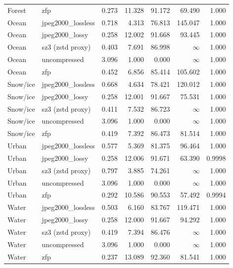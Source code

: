 \begin{table}[t]
\begin{tabular}{@{}llrrrrr@{}}
Forest      & zfp                & 0.273 & 11.328 & 91.172 & 69.490   & 1.000 \\
Ocean       & jpeg2000\_lossless & 0.718 & 4.313  & 76.813 & 145.047  & 1.000 \\
Ocean       & jpeg2000\_lossy    & 0.258 & 12.002 & 91.668 & 93.445   & 1.000 \\
Ocean       & sz3 (zstd proxy)   & 0.403 & 7.691  & 86.998 & $\infty$ & 1.000 \\
Ocean       & uncompressed       & 3.096 & 1.000  & 0.000  & $\infty$ & 1.000 \\
Ocean       & zfp                & 0.452 & 6.856  & 85.414 & 105.602  & 1.000 \\
Snow/ice    & jpeg2000\_lossless & 0.668 & 4.634  & 78.421 & 120.012  & 1.000 \\
Snow/ice    & jpeg2000\_lossy    & 0.258 & 12.001 & 91.667 & 75.531   & 1.000 \\
Snow/ice    & sz3 (zstd proxy)   & 0.411 & 7.532  & 86.723 & $\infty$ & 1.000 \\
Snow/ice    & uncompressed       & 3.096 & 1.000  & 0.000  & $\infty$ & 1.000 \\
Snow/ice    & zfp                & 0.419 & 7.392  & 86.473 & 81.514   & 1.000 \\
Urban       & jpeg2000\_lossless & 0.577 & 5.369  & 81.375 & 96.464   & 1.000 \\
Urban       & jpeg2000\_lossy    & 0.258 & 12.006 & 91.671 & 63.390   & 0.9998 \\
Urban       & sz3 (zstd proxy)   & 0.797 & 3.885  & 74.261 & $\infty$ & 1.000 \\
Urban       & uncompressed       & 3.096 & 1.000  & 0.000  & $\infty$ & 1.000 \\
Urban       & zfp                & 0.292 & 10.586 & 90.553 & 57.492   & 0.9994 \\
Water       & jpeg2000\_lossless & 0.503 & 6.160  & 83.767 & 119.471  & 1.000 \\
Water       & jpeg2000\_lossy    & 0.258 & 12.000 & 91.667 & 94.292   & 1.000 \\
Water       & sz3 (zstd proxy)   & 0.419 & 7.394  & 86.476 & $\infty$ & 1.000 \\
Water       & uncompressed       & 3.096 & 1.000  & 0.000  & $\infty$ & 1.000 \\
Water       & zfp                & 0.237 & 13.089 & 92.360 & 81.541   & 1.000 \\
\bottomrule
\end{tabular}
\end{table}
